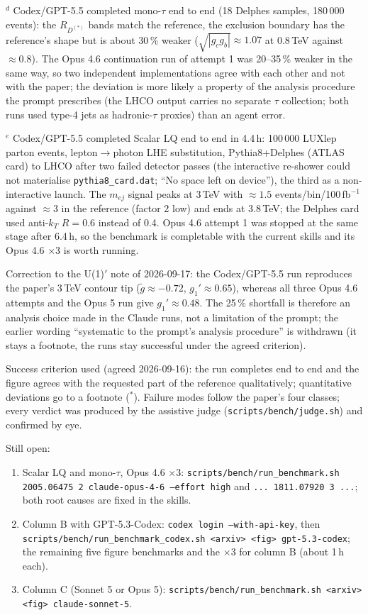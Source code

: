 \documentclass[11pt]{article}
\begin{document}
\noindent$^{d}$ Codex/GPT-5.5 completed mono-$\tau$ end to end (18 Delphes samples, 180\,000 events): the $R_{D^{(*)}}$ bands
match the reference, the exclusion boundary has the reference's shape but is about 30\,\% weaker ($\sqrt{|g_cg_b|}\approx1.07$
at 0.8\,TeV against $\approx0.8$). The Opus 4.6 continuation run of attempt 1 was 20--35\,\% weaker in the same way, so
two independent implementations agree with each other and not with the paper; the deviation is more likely a property of the
analysis procedure the prompt prescribes (the LHCO output carries no separate $\tau$ collection; both runs used type-4 jets
as hadronic-$\tau$ proxies) than an agent error.

\noindent$^{e}$ Codex/GPT-5.5 completed Scalar LQ end to end in 4.4\,h: 100\,000 LUXlep parton events, lepton$\to$photon LHE
substitution, Pythia8+Delphes (ATLAS card) to LHCO after two failed detector passes (the interactive re-shower could not
materialise \texttt{pythia8\_card.dat}; ``No space left on device''), the third as a non-interactive launch. The $m_{ej}$
signal peaks at 3\,TeV with $\approx1.5$ events/bin/100\,fb$^{-1}$ against $\approx3$ in the reference (factor 2 low) and ends
at 3.8\,TeV; the Delphes card used anti-$k_T$ $R=0.6$ instead of 0.4. Opus 4.6 attempt 1 was stopped at the same stage after
6.4\,h, so the benchmark is completable with the current skills and its Opus 4.6 $\times$3 is worth running.

Correction to the U(1)$'$ note of 2026-09-17: the Codex/GPT-5.5 run reproduces the paper's 3\,TeV contour tip
($\tilde g\approx-0.72$, $g_1'\approx0.65$), whereas all three Opus 4.6 attempts and the Opus 5 run give $g_1'\approx0.48$.
The 25\,\% shortfall is therefore an analysis choice made in the Claude runs, not a limitation of the prompt; the earlier
wording ``systematic to the prompt's analysis procedure'' is withdrawn (it stays a footnote, the runs stay successful under
the agreed criterion).

Success criterion used (agreed 2026-09-16): the run completes end to end and the figure agrees with the requested part of
the reference qualitatively; quantitative deviations go to a footnote ($^{*}$). Failure modes follow the paper's four
classes; every verdict was produced by the assistive judge (\texttt{scripts/bench/judge.sh}) and confirmed by eye.

Still open:
\begin{enumerate}
\item Scalar LQ and mono-$\tau$, Opus 4.6 $\times$3: \texttt{scripts/bench/run\_benchmark.sh 2005.06475 2 claude-opus-4-6
  --effort high} and \texttt{... 1811.07920 3 ...}; both root causes are fixed in the skills.
\item Column B with GPT-5.3-Codex: \texttt{codex login --with-api-key}, then
  \texttt{scripts/bench/run\_benchmark\_codex.sh <arxiv> <fig> gpt-5.3-codex}; the remaining five figure benchmarks and the
  $\times$3 for column B (about 1\,h each).
\item Column C (Sonnet 5 or Opus 5): \texttt{scripts/bench/run\_benchmark.sh <arxiv> <fig> claude-sonnet-5}.
\end{enumerate}
\end{document}
